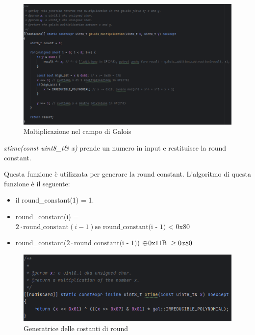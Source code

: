 \begin{figure}[H]
	\centering
	\includegraphics[width=1\textwidth, height=1\textheight, keepaspectratio]{./images/code/cpp/galois_math/galois_multiplication.PNG}
	\caption{Moltiplicazione nel campo di Galois}
	\label{fig:galois_multiplication}
\end{figure}

\textsf{\small \emph{xtime(const uint8\_t\& x)} prende un numero in input e restituisce la round constant.} %

\textsf{\small Questa funzione è utilizzata per generare la round constant.}
\textsf{\small L'algoritmo di questa funzione è il seguente: }

\begin{itemize}
	\item \textsf{\small il round\_constant(1) = 1.}
	\item \textsf{\small round\_constant(i) = $2 \cdot \text{round\_constant}(i - 1) \text{se round\_constant(i - 1) < 0x80}$}
	\item \textsf{\small round\_constant($2 \cdot \text{round\_constant(i - 1)}$) $ \oplus \hspace{0.3mm} \text{0x11B } \ge 0x80$ }
\end{itemize}

\begin{figure}[H] %
	\centering
	\includegraphics[width=1\textwidth, height=1\textheight, keepaspectratio]{./images/code/cpp/galois_math/xtime.PNG}
	\caption{Generatrice delle costanti di round}
	\label{fig:xtime}
\end{figure}

